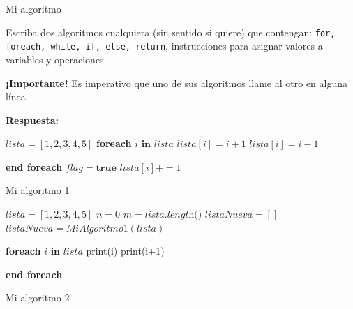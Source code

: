 \documentclass[letterpaper,10pt]{article}
\begin{document}
\begin{enumerate}[1)]
\begin{minipage}{0.35\textwidth}
\begin{algorithm}[H]
\begin{algorithmic}[1]
\ENDWHILE
{}
\end{algorithmic}
\caption{Mi algoritmo}
\label{alg:pri}
\end{algorithm}
\end{minipage}
\hfill
\begin{minipage}{0.6\textwidth}
Escriba dos algoritmos cualquiera (sin sentido si quie\-re) que contengan: \texttt{for, foreach, while, if, else, return}, instrucciones para asignar valores a variables y ope\-raciones. 

\textbf{¡Importante!} Es imperativo que uno de sus algoritmos llame al otro en alguna línea. 
\end{minipage}
\end{enumerate}

\textbf{Respuesta:}

\begin{minipage}{0.4\textwidth}
	
	\begin{algorithm}[H]
		\begin{algorithmic}
			\STATE $lista = [1, 2, 3, 4, 5]$
			\STATE 	\textbf{foreach} $i \textbf{ in } lista$
				\STATE $lista[i] = i + 1$
			\ELSE
				\STATE $lista[i] = i - 1$
					
			\ENDIF 
			\STATE \textbf{end foreach}
			\STATE $flag = \textbf{true}$
				\STATE $lista[i] += 1$
			\ENDWHILE

			\end{algorithmic}
		
			\caption{Mi algoritmo 1}
	\end{algorithm}
\end{minipage}

\begin{minipage}{0.4\textwidth}
	
	\begin{algorithm}[H]
		\begin{algorithmic}
			\STATE $lista= [1, 2, 3, 4, 5]$
			\STATE $n = 0$
			\STATE $m = lista.\textit{length()}$
			\STATE $listaNueva = []$
			\WHILE{$n \geq m$}
				\STATE $listaNueva = MiAlgoritmo1(lista)$

			\ENDWHILE
		
			\STATE 	\textbf{foreach} $i \textbf{ in } lista$
			\IF {$i != n$} 
				\STATE print(i)
			\ELSE
				\STATE print(i+1)
					
			\ENDIF 
			\STATE \textbf{end foreach}

			\RETURN{$lista$}
			\end{algorithmic}
		
			\caption{Mi algoritmo 2}
	\end{algorithm}
\end{minipage}




\end{document}

